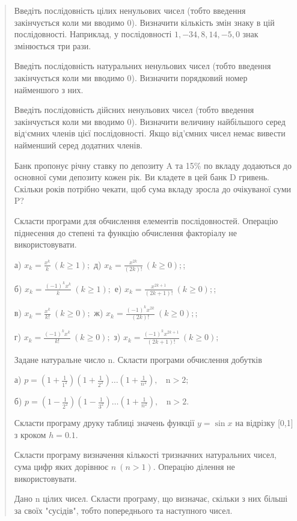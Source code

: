 \documentclass[]{article}
\begin{document}
\begin{quote}
Введіть послідовність цілих ненульових чисел (тобто введення
закінчується коли ми вводимо 0). Визначити кількість змін знаку в цій
послідовності. Наприклад, у послідовності $1, -34, 8, 14, -5, 0$ знак
змінюється три рази.

Введіть послідовність натуральних ненульових чисел (тобто введення
закінчується коли ми вводимо 0). Визначити порядковий номер найменшого з
них.

Введіть послідовність дійсних ненульових чисел (тобто введення
закінчується коли ми вводимо 0). Визначити величину найбільшого серед
від`ємних членів цієї послідовності. Якщо від'ємних чисел немає вивести
найменший серед додатних членів.

Банк пропонує річну ставку по депозиту A та 15\% по вкладу додаються до
основної суми депозиту кожен рік. Ви кладете в цей банк D гривень.
Скільки років потрібно чекати, щоб сума вкладу зросла до очікуваної суми
P?

Скласти програми для обчислення елементів послідовностей. Операцію
піднесення до степені та функцію обчислення факторіалу не
використовувати.

а) \(x_{k} = \frac{x^{k}}{k}\ (k \geq 1);\) д)
\(x_{k} = \frac{x^{2k}}{(2k)!}\ (k \geq 0);\);

б) \(x_{k} = \frac{( - 1)^{k}x^{k}}{k}\ (k \geq 1);\) е)
\(x_{k} = \frac{x^{2k + 1}}{(2k + 1)!}\ (k \geq 0);\);

в) \(x_{k} = \frac{x^{k}}{k!}\ (k \geq 0);\) ж)
\(x_{k} = \frac{( - 1)^{k}x^{2k}}{(2k)!}\ (k \geq 0);\);

г) \(x_{k} = \frac{( - 1)^{k}x^{k}}{k!}\ (k \geq 0);\) з)
\(x_{k} = \frac{( - 1)^{k}x^{2k + 1}}{(2k + 1)!}\ (k \geq 0);\)

Задане натуральне число n. Скласти програми обчислення добутків

а)
\(p = \left( 1 + \frac{1}{1^{2}} \right)\left( 1 + \frac{1}{2^{2}} \right)\ldots\left( 1 + \frac{1}{n^{2}} \right),\mathrm{\ \ \ \ n > 2};\)

б)
\(p = \left( 1 - \frac{1}{2^{2}} \right)\left( 1 - \frac{1}{3^{2}} \right)\ldots\left( 1 + \frac{1}{n^{2}} \right),\mathrm{\ \ \ \ n > 2.}\)

Скласти програму друку таблиці значень функції \(y = \sin x\) на
відрізку {[}0,1{]} з кроком \(h = 0.1.\)

Скласти програму визначення кількості тризначних натуральних чисел, сума
цифр яких дорівнює \(n\ (n > 1).\) Операцію ділення не використовувати.

Дано n цілих чисел. Скласти програму, що визначає, скільки з них більші
за своїх "сусідів", тобто попереднього та наступного чисел.


\end{quote}
\end{document}
